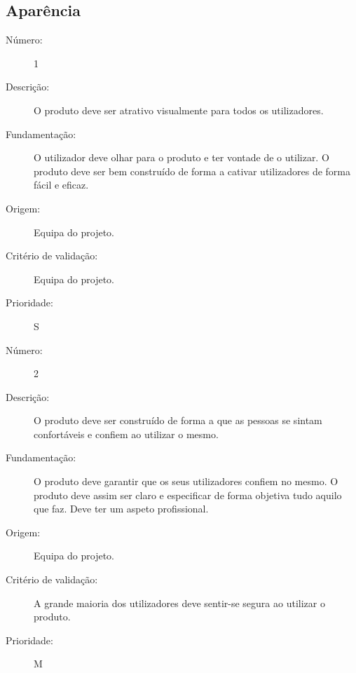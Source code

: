 \documentclass{article}
\begin{document}
  \subsection{Aparência}

            \begin{description}
        \item[Número:]1
        \item[Descrição:]O produto deve ser atrativo visualmente para todos os utilizadores.
        \item[Fundamentação:]O utilizador deve olhar para o produto e ter vontade de o utilizar. O produto deve ser bem construído de forma a cativar utilizadores de forma fácil e eficaz. 
        \item[Origem:] Equipa do projeto.
        \item[Critério de validação:] Equipa do projeto.
        \item[Prioridade:]S
      \end{description}
      \vspace{0.5cm}
            \begin{description}
        \item[Número:]2
        \item[Descrição:]O produto deve ser construído de forma a que as pessoas se sintam confortáveis e confiem ao utilizar o mesmo. 
        \item[Fundamentação:]O produto deve garantir que os seus utilizadores confiem no mesmo. O produto deve assim ser claro e especificar de forma objetiva tudo aquilo que faz. Deve ter um aspeto profissional.
        \item[Origem:]Equipa do projeto.
        \item[Critério de validação:]A grande maioria dos utilizadores deve sentir-se segura ao utilizar o produto.
        \item[Prioridade:]M
      \end{description}
\end{document}
